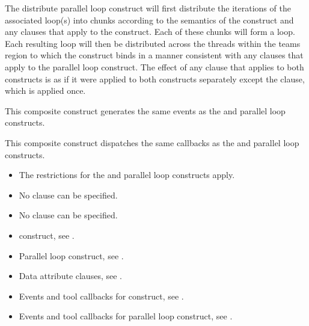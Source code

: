 \descr
The distribute parallel loop construct will first distribute the iterations of the associated loop(s) into chunks according to the semantics of the  construct and any clauses that apply to the  construct. Each of these chunks will form a loop. Each resulting loop will then be distributed across the threads within the teams region to which the  construct binds in a manner consistent with any clauses that apply to the parallel loop construct. 
The effect of any clause that applies to both constructs is as if it were applied to both constructs separately except the  clause, which is applied once.

\events

This composite construct generates the same events as the  and parallel loop constructs.

\tools

This composite construct dispatches the same callbacks as the  and parallel loop constructs.

\vspace{-6pt}

\restrictions
\begin{itemize}
\item The restrictions for the  and parallel loop constructs apply.
\item No  clause can be specified.
\item No  clause can be specified.
\end{itemize}

\vspace{-6pt}

\crossreferences
\begin{itemize}
\item {} construct, see 
.

\item Parallel loop construct, see 
.

\item Data attribute clauses, see 
.

\item Events and tool callbacks for  construct, see
.

\item Events and tool callbacks for parallel loop construct, see
.

\end{itemize}






